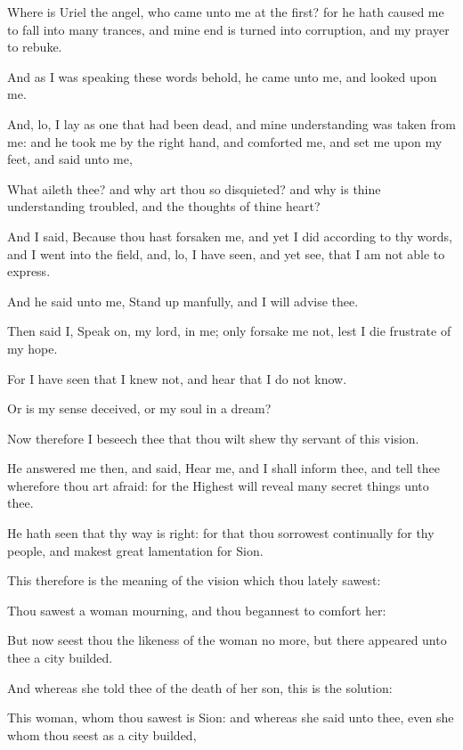 {\par }{\PP {}Where is Uriel the angel, who came unto me at the first? for he hath caused me to fall into many trances, and mine end is turned into corruption, and my prayer to rebuke.
\par }{\PP {}And as I was speaking these words behold, he came unto me, and looked upon me.
\par }{\PP {}And, lo, I lay as one that had been dead, and mine understanding was taken from me: and he took me by the right hand, and comforted me, and set me upon my feet, and said unto me,
\par }{\PP {}What aileth thee? and why art thou so disquieted? and why is thine understanding troubled, and the thoughts of thine heart?
\par }{\PP {}And I said, Because thou hast forsaken me, and yet I did according to thy words, and I went into the field, and, lo, I have seen, and yet see, that I am not able to express.
\par }{\PP {}And he said unto me, Stand up manfully, and I will advise thee.
\par }{\PP {}Then said I, Speak on, my lord, in me; only forsake me not, lest I die frustrate of my hope.
\par }{\PP {}For I have seen that I knew not, and hear that I do not know.
\par }{\PP {}Or is my sense deceived, or my soul in a dream?
\par }{\PP {}Now therefore I beseech thee that thou wilt shew thy servant of this vision.
\par }{\PP {}He answered me then, and said, Hear me, and I shall inform thee, and tell thee wherefore thou art afraid: for the Highest will reveal many secret things unto thee.
\par }{\PP {}He hath seen that thy way is right: for that thou sorrowest continually for thy people, and makest great lamentation for Sion.
\par }{\PP {}This therefore is the meaning of the vision which thou lately sawest:
\par }{\PP {}Thou sawest a woman mourning, and thou begannest to comfort her:
\par }{\PP {}But now seest thou the likeness of the woman no more, but there appeared unto thee a city builded.
\par }{\PP {}And whereas she told thee of the death of her son, this is the solution:
\par }{\PP {}This woman, whom thou sawest is Sion: and whereas she said unto thee, even she whom thou seest as a city builded,
}
